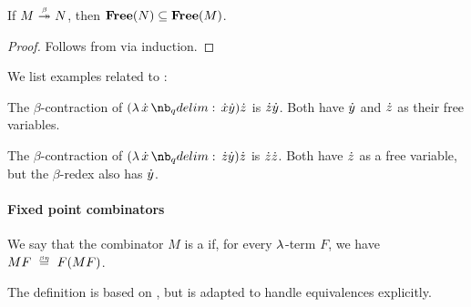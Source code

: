 \begin{corollary}\label{thm:beta_reduction_free_variables_contra}
  If \( M \bred* N \), then \( \op*{Free}(N) \subseteq \op*{Free}(M) \).
\end{corollary}
\begin{proof}
  Follows from  via induction.
\end{proof}

\begin{example}\label{ex:thm:beta_reduction_free_variables}
  We list examples related to :
  \begin{thmenum}
     The \( \beta \)-contraction of \( (\qabs \synx \synx \syny) \synz \) is \( {\dot{z}} {\dot{y}} \). Both have \( {\dot{y}} \) and \( {\dot{z}} \) as their free variables.

     The \( \beta \)-contraction of \( (\qabs \synx \synz \syny) \synz \) is \( {\dot{z}} {\dot{z}} \). Both have \( {\dot{z}} \) as a free variable, but the \( \beta \)-redex also has \( {\dot{y}} \).
  \end{thmenum}
\end{example}

\paragraph{Fixed point combinators}

\begin{definition}\label{def:fixed_point_combinator}\mimprovised
  We say that the combinator \( M \) is a  if, for every \( \mathrm{\lambda} \)-term \( F \), we have \( MF \beequiv F(MF) \).
\end{definition}
\begin{comments}
  \item The definition is based on \cite[6.1.2]{Barendregt1984}, but is adapted to handle equivalences explicitly.
\end{comments}

